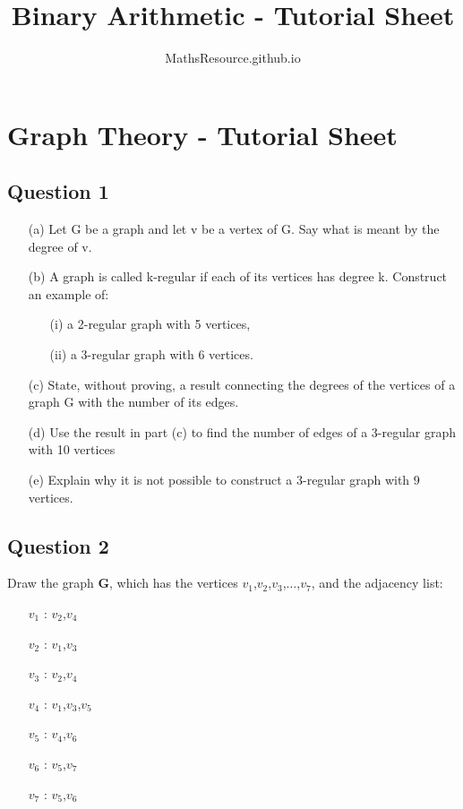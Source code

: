 \documentclass[]{article}
\title{Binary Arithmetic - Tutorial Sheet}
\author{MathsResource.github.io}
\begin{document}
\section*{Graph Theory - Tutorial Sheet}
\subsection*{Question 1}
\begin{itemize}
\item[(a)] Let G be a graph and let v be a vertex of G. Say what is meant by the degree
of v. %
\item[(b)] A graph is called k-regular if each of its vertices has degree k. Construct an
example of:
\begin{itemize}
\item[(i)] a 2-regular graph with 5 vertices, %
\item[(ii)] a 3-regular graph with 6 vertices. %
\end{itemize}
\item[(c)] State, without proving, a result connecting the degrees of the vertices of
a graph G with the number of its edges. %
\item[(d)] Use the result in part (c) to find the number of edges of a 3-regular graph with 10
vertices %
\item[(e)] Explain why it is not possible to construct a 3-regular graph with 9 vertices. %

\end{itemize}


\subsection*{Question 2}


Draw the graph \textbf{G}, which has the vertices $v_1$,$v_2$,$v_3$,$\ldots$,$v_7$, and the adjacency list:

\begin{multicols}{2}
\begin{itemize}
\item[$v_1$]: $v_2$,$v_4$
\item[$v_2$]: $v_1$,$v_3$
\item[$v_3$]: $v_2$,$v_4$
\item[$v_4$]: $v_1$,$v_3$,$v_5$
\item[$v_5$]: $v_4$,$v_6$
\item[$v_6$]: $v_5$,$v_7$
\item[$v_7$]: $v_5$,$v_6$
\end{itemize}
\end{multicols}
\end{document}
